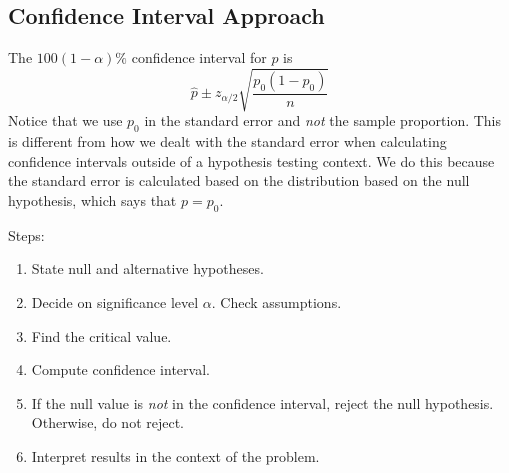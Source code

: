 \documentclass[
]{book}
\providecommand{\tightlist}{%
  \setlength{\itemsep}{0pt}\setlength{\parskip}{0pt}}
\begin{document}
\subsection{Confidence Interval Approach}\label{confidence-interval-approach}

The \(100(1-\alpha)\%\) confidence interval for \(p\) is \[\hat{p}\pm z_{\alpha/2}\sqrt{\frac{p_0(1-p_0)}{n}}\] Notice that we use \(p_0\) in the standard error and \emph{not} the sample proportion. This is different from how we dealt with the standard error when calculating confidence intervals outside of a hypothesis testing context. We do this because the standard error is calculated based on the distribution based on the null hypothesis, which says that \(p=p_0\).

Steps:

\begin{enumerate}
\def\labelenumi{\arabic{enumi}.}
\tightlist
\item
  State null and alternative hypotheses.
\item
  Decide on significance level \(\alpha\). Check assumptions.
\item
  Find the critical value.
\item
  Compute confidence interval.
\item
  If the null value is \emph{not} in the confidence interval, reject the null hypothesis. Otherwise, do not reject.
\item
  Interpret results in the context of the problem.
\end{enumerate}
\end{document}

